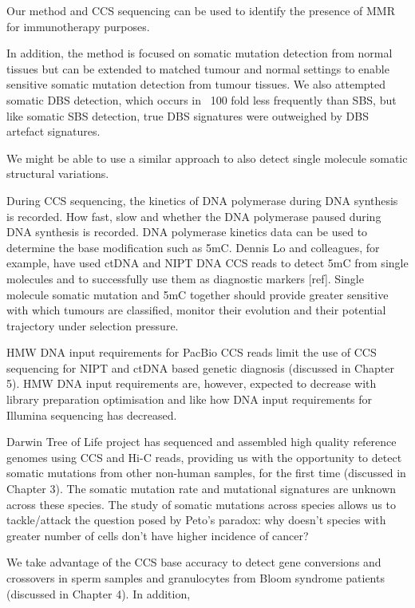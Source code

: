 Our method and CCS sequencing can be used to identify the presence of MMR for immunotherapy purposes. 

In addition, the method is focused on somatic mutation detection from normal tissues but can be extended to matched tumour and normal settings to enable sensitive somatic mutation detection from tumour tissues. We also attempted somatic DBS detection, which occurs in ~100 fold less frequently than SBS, but like somatic SBS detection, true DBS signatures were outweighed by DBS artefact signatures. 

We might be able to use a similar approach to also detect single molecule somatic structural variations. 

During CCS sequencing, the kinetics of DNA polymerase during DNA synthesis is recorded. How fast, slow and whether the DNA polymerase paused during DNA synthesis is recorded. DNA polymerase kinetics data can be used to determine the base modification such as 5mC. Dennis Lo and colleagues, for example, have used ctDNA and NIPT DNA CCS reads to detect 5mC from single molecules and to successfully use them as diagnostic markers [ref]. Single molecule somatic mutation and 5mC together should provide greater sensitive with which tumours are classified, monitor their evolution and their potential trajectory under selection pressure. 

HMW DNA input requirements for PacBio CCS reads limit the use of CCS sequencing for NIPT and ctDNA based genetic diagnosis (discussed in Chapter 5). HMW DNA input requirements are, however, expected to decrease with library preparation optimisation and like how DNA input requirements for Illumina sequencing has decreased. 

Darwin Tree of Life project has sequenced and assembled high quality reference genomes using CCS and Hi-C reads, providing us with the opportunity to detect somatic mutations from other non-human samples, for the first time (discussed in Chapter 3). The somatic mutation rate and mutational signatures are unknown across these species. The study of somatic mutations across species allows us to tackle/attack the question posed by Peto's paradox: why doesn't species with greater number of cells don't have higher incidence of cancer?

We take advantage of the CCS base accuracy to detect gene conversions and crossovers in sperm samples and granulocytes from Bloom syndrome patients (discussed in Chapter 4). In addition,

